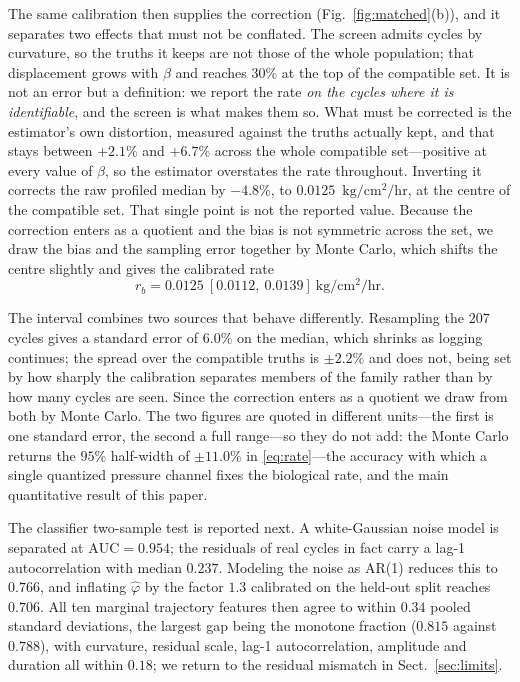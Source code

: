 \documentclass[runningheads]{llncs}
\newcommand{\ratu}{\ensuremath{\mathrm{kg/cm^{2}/hr}}}
\newcommand{\rb}{\ensuremath{r_{b}}}
\begin{document}
The same calibration then supplies the correction
(Fig.~\ref{fig:matched}(b)), and it separates two effects that must not
be conflated. The screen admits cycles by curvature, so the truths it
keeps are not those of the whole population; that displacement grows
with $\beta$ and reaches $30\%$ at the top of the compatible set. It is
not an error but a definition: we report the rate \emph{on the cycles
where it is identifiable}, and the screen is what makes them so. What
must be corrected is the estimator's own distortion, measured against
the truths actually kept, and that stays between $+2.1\%$ and
$+6.7\%$ across the whole compatible set---positive at every value of
$\beta$, so the estimator overstates the rate throughout. Inverting it corrects the raw
profiled median by $-4.8\%$, to $0.0125$~\ratu{}, at the centre of the
compatible set. That single point is not the reported value. Because
the correction enters as a quotient and the bias is not symmetric
across the set, we draw the bias and the sampling error together by
Monte Carlo, which shifts the centre slightly and gives the calibrated
rate
\begin{equation}
\rb = 0.0125\ [0.0112,\ 0.0139]~\ratu{} .
\label{eq:rate}
\end{equation}

The interval combines two sources that behave differently. Resampling
the $207$ cycles gives a standard error of $6.0\%$ on the median, which
shrinks as logging continues; the spread over the compatible truths is
$\pm 2.2\%$ and does not, being set by how sharply the calibration
separates members of the family rather than by how many cycles are
seen. Since the correction enters as a quotient we draw from both by
Monte Carlo. The two figures are quoted in different units---the first
is one standard error, the second a full range---so they do not add:
the Monte Carlo returns the $95\%$ half-width of $\pm 11.0\%$ in
\eqref{eq:rate}---the accuracy
with which a single quantized pressure channel fixes the biological
rate, and the main quantitative result of this paper.

The classifier two-sample test is reported next. A
white-Gaussian noise model is separated at $\mathrm{AUC}=0.954$; the
residuals of real cycles in fact carry a lag-1 autocorrelation with
median $0.237$. Modeling the noise as AR(1) reduces this to $0.766$,
and inflating $\hat{\varphi}$ by the factor $1.3$ calibrated on the
held-out split reaches $0.706$. All ten marginal trajectory features
then agree to within $0.34$ pooled standard deviations, the largest gap
being the monotone fraction ($0.815$ against $0.788$), with curvature,
residual scale, lag-1 autocorrelation, amplitude and duration all
within $0.18$; we return to the residual mismatch in
Sect.~\ref{sec:limits}.
\end{document}
